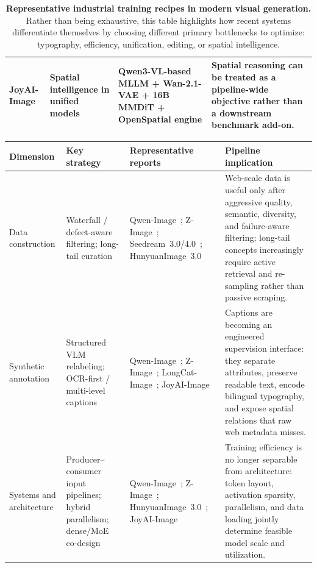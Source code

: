 \documentclass{llmxive}
\providecommand{\arraystretch}{1.20}
\begin{document}
\begin{table}[t]
\begin{tabularx}{\textwidth}{@{}>{\arraybackslash}p{2.9cm}>{\arraybackslash}p{2.4cm}>{\arraybackslash}p{4.0cm}>{\arraybackslash}X@{}}
JoyAI-Image \citep{jdjoyaiimage} & Spatial intelligence in unified models & Qwen3-VL-based MLLM + Wan-2.1-VAE + 16B MMDiT + OpenSpatial engine & Spatial reasoning can be treated as a pipeline-wide objective rather than a downstream benchmark add-on. \\
\bottomrule
\end{tabularx}
\caption{\textbf{Representative industrial training recipes in modern visual generation.} Rather than being exhaustive, this table highlights how recent systems differentiate themselves by choosing different primary bottlenecks to optimize: typography, efficiency, unification, editing, or spatial intelligence.}
\label{tab:industrial_training_recipes}
\end{table}

\begin{table}[t]
\centering
\scriptsize
\setlength{\tabcolsep}{3.5pt}
\renewcommand{\arraystretch}{1.16}
\begin{tabularx}{\textwidth}{@{}>{\arraybackslash}p{2.6cm}>{\arraybackslash}p{3.0cm}>{\arraybackslash}p{4.6cm}>{\arraybackslash}X@{}}
\toprule
\textbf{Dimension} & \textbf{Key strategy} & \textbf{Representative reports} & \textbf{Pipeline implication} \\
\midrule
Data construction & Waterfall / defect-aware filtering; long-tail curation & Qwen-Image~\citep{wu2025qwen}; Z-Image~\citep{cai2025z}; Seedream~3.0/4.0~\citep{gao2025seedream,seedream2025seedream}; HunyuanImage~3.0~\citep{cao2025hunyuanimage} & Web-scale data is useful only after aggressive quality, semantic, diversity, and failure-aware filtering; long-tail concepts increasingly require active retrieval and re-sampling rather than passive scraping. \\
\midrule
Synthetic annotation & Structured VLM relabeling; OCR-first / multi-level captions & Qwen-Image~\citep{wu2025qwen}; Z-Image~\citep{cai2025z}; LongCat-Image~\citep{team2025longcat}; JoyAI-Image~\citep{jdjoyaiimage} & Captions are becoming an engineered supervision interface: they separate attributes, preserve readable text, encode bilingual typography, and expose spatial relations that raw web metadata misses. \\
\midrule
Systems and architecture & Producer--consumer input pipelines; hybrid parallelism; dense/MoE co-design & Qwen-Image~\citep{wu2025qwen}; Z-Image~\citep{cai2025z}; HunyuanImage~3.0~\citep{cao2025hunyuanimage}; JoyAI-Image~\citep{jdjoyaiimage} & Training efficiency is no longer separable from architecture: token layout, activation sparsity, parallelism, and data loading jointly determine feasible model scale and utilization. \\

\end{tabularx}
\end{table}
\end{document}
